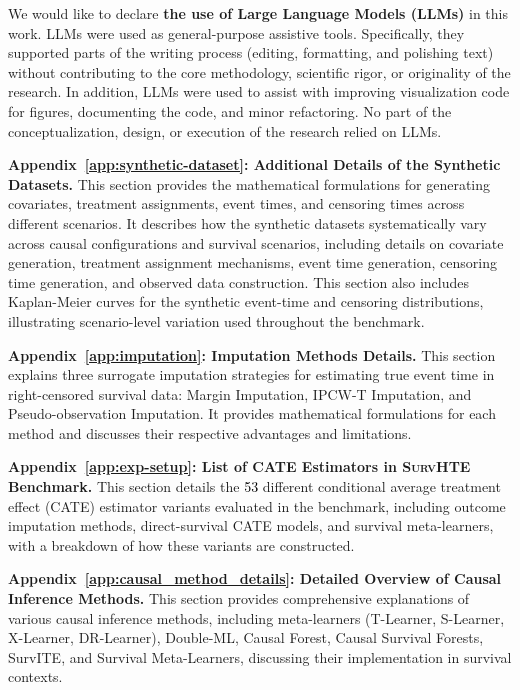 \documentclass{article} %
\newcommand{\rebuttal}[1]{\textcolor{black}{#1}}
\begin{document}
We would like to declare \textbf{the use of Large Language Models (LLMs)} in this work. LLMs were used as general-purpose assistive tools. Specifically, they supported parts of the writing process (editing, formatting, and polishing text) without contributing to the core methodology, scientific rigor, or originality of the research. In addition, LLMs were used to assist with improving visualization code for figures, documenting the code, and minor refactoring. No part of the conceptualization, design, or execution of the research relied on LLMs.

\textbf{Appendix~\ref{app:synthetic-dataset}: Additional Details of the Synthetic Datasets.}
This section provides the mathematical formulations for generating covariates, treatment assignments, event times, and censoring times across different scenarios. It describes how the synthetic datasets systematically vary across causal configurations and survival scenarios, including details on covariate generation, treatment assignment mechanisms, event time generation, censoring time generation, and observed data construction.
This section also includes Kaplan-Meier curves for the synthetic event-time and censoring distributions, illustrating scenario-level variation used throughout the benchmark.

\textbf{Appendix~\ref{app:imputation}: Imputation Methods Details.}
This section explains three surrogate imputation strategies for estimating true event time in right-censored survival data: Margin Imputation, IPCW-T Imputation, and Pseudo-observation Imputation. It provides mathematical formulations for each method and discusses their respective advantages and limitations.

\textbf{Appendix~\ref{app:exp-setup}: List of CATE Estimators in \textsc{SurvHTE} Benchmark.}
This section details the \rebuttal{53} different conditional average treatment effect (CATE) estimator variants evaluated in the benchmark, including outcome imputation methods, direct-survival CATE models, and survival meta-learners, with a breakdown of how these variants are constructed.

\textbf{Appendix~\ref{app:causal_method_details}: Detailed Overview of Causal Inference Methods.}
This section provides comprehensive explanations of various causal inference methods, including meta-learners (T-Learner, S-Learner, X-Learner, DR-Learner), Double-ML, Causal Forest, Causal Survival Forests, SurvITE, and Survival Meta-Learners, discussing their implementation in survival contexts.
\end{document}
